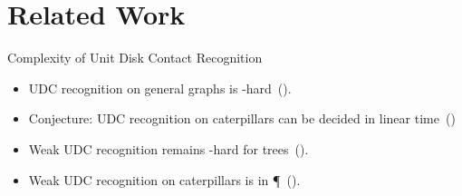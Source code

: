 \documentclass[aspectratio=169,notes]{beamer}
\newcommand\unfootnote[1]{%
  \begingroup
  \renewcommand\thefootnote{}\footnote{#1}%
  \addtocounter{footnote}{-1}%
  \endgroup
}
\begin{document}
\section{Related Work}





\begin{frame}{Complexity of Unit Disk Contact Recognition}

\begin{itemize}
\item UDC recognition on general graphs is \NP-hard~(\cite{Breu1998}).
\item Conjecture: UDC recognition on caterpillars can be decided in linear time~(\cite{klemz_recognizing_2022})
\item Weak UDC recognition remains \NP-hard for trees~(\cite{Cleve2020}).
\item Weak UDC recognition on caterpillars is in \P~(\cite{Cleve2020}).
\end{itemize}

\end{frame}
\end{document}
